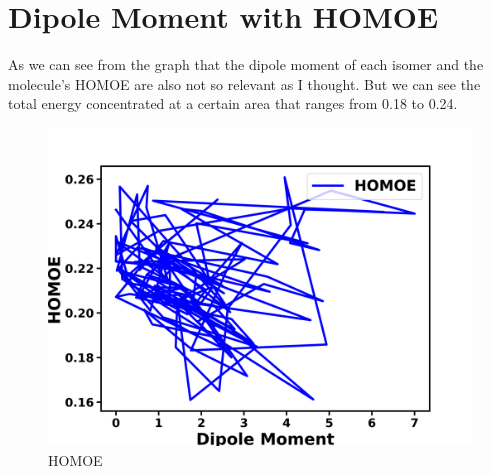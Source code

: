 \documentclass{article}
\begin{document}
\section{Dipole Moment with HOMOE}
As we can see from the graph that the dipole moment of each isomer and the molecule's HOMOE are also not so relevant as I thought. But we can see the total energy concentrated at a certain area that ranges from 0.18 to 0.24.
\begin{figure}[H]
\centering
\includegraphics[scale=0.5]{HOMOE.png}
\caption{HOMOE}
\label{fig:HOMOE}
\end{figure}
\end{document}
